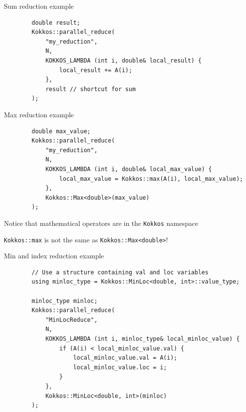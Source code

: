 \documentclass[
    aspectratio=169,
    handout,
]{beamer}
\begin{document}

\begin{frame}[fragile]{Sum reduction example}
    \begin{verbatim}
        double result;
        Kokkos::parallel_reduce(
            "my_reduction",
            N,
            KOKKOS_LAMBDA (int i, double& local_result) {
                local_result += A(i);
            },
            result // shortcut for sum
        );
    \end{verbatim}
\end{frame}


\begin{frame}[fragile]{Max reduction example}
    \begin{verbatim}
        double max_value;
        Kokkos::parallel_reduce(
            "my_reduction",
            N,
            KOKKOS_LAMBDA (int i, double& local_max_value) {
                local_max_value = Kokkos::max(A(i), local_max_value);
            },
            Kokkos::Max<double>(max_value)
        );
    \end{verbatim}

     Notice that mathematical operators are in the \texttt{Kokkos} namespace

     \texttt{Kokkos::max} is not the same as \texttt{Kokkos::Max<double>}!
\end{frame}


\begin{frame}[fragile]{Min and index reduction example}
    \begin{verbatim}
        // Use a structure containing val and loc variables
        using minloc_type = Kokkos::MinLoc<double, int>::value_type;

        minloc_type minloc;
        Kokkos::parallel_reduce(
            "MinLocReduce",
            N,
            KOKKOS_LAMBDA (int i, minloc_type& local_minloc_value) {
                if (A(i) < local_minloc_value.val) {
                    local_minloc_value.val = A(i);
                    local_minloc_value.loc = i;
                }
            },
            Kokkos::MinLoc<double, int>(minloc)
        );
    \end{verbatim}
\end{frame}
\end{document}
